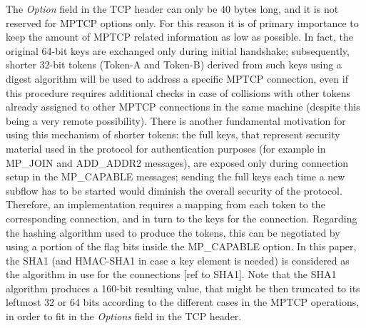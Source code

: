 The \textit{Option} field in the TCP header can only be 40 bytes long, and it is not reserved for MPTCP options only. For this reason it is of primary importance to keep the amount of MPTCP related information as low as possible. In fact, the original 64-bit keys are exchanged only during initial handshake; subsequently, shorter 32-bit tokens (Token-A and Token-B) derived from such keys using a digest algorithm will be used to address a specific MPTCP connection, even if this procedure requires additional checks in case of collisions with other tokens already assigned to other MPTCP connections in the same machine (despite this being a very remote possibility). There is another fundamental motivation for using this mechanism of shorter tokens: the full keys, that represent security material used in the protocol for authentication purposes (for example in MP\_JOIN and ADD\_ADDR2 messages), are exposed only during connection setup in the MP\_CAPABLE messages; sending the full keys each time a new subflow has to be started would diminish the overall security of the protocol. Therefore, an implementation requires a mapping from each token to the corresponding connection, and in turn to the keys for the connection.
Regarding the hashing algorithm used to produce the tokens, this can be negotiated by using a portion of the flag bits inside the MP\_CAPABLE option. In this paper, the SHA1 (and HMAC-SHA1 in case a key element is needed) is considered as the algorithm in use for the connections [ref to SHA1]. Note that the SHA1 algorithm produces a 160-bit resulting value, that might be then truncated to its leftmost 32 or 64 bits according to the different cases in the MPTCP operations, in order to fit in the \textit{Options} field in the TCP header.


